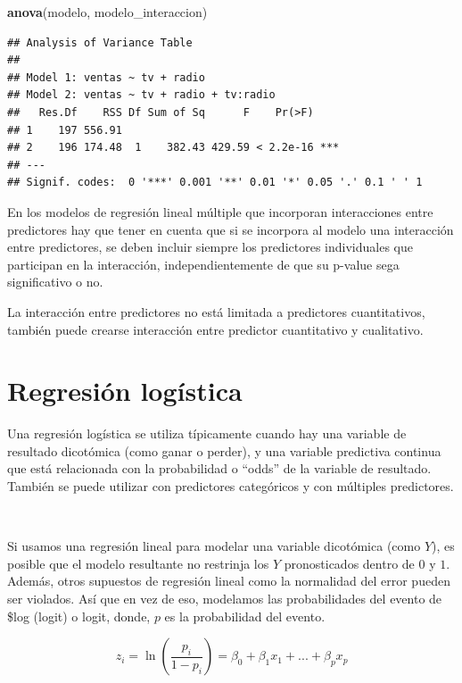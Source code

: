\documentclass[]{book}
\newenvironment{Shaded}{\begin{snugshade}}{\end{snugshade}}
\newcommand{\KeywordTok}[1]{\textcolor[rgb]{0.13,0.29,0.53}{\textbf{#1}}}
\newcommand{\NormalTok}[1]{#1}
\begin{document}
\begin{Shaded}
\begin{Highlighting}[]
\KeywordTok{anova}\NormalTok{(modelo, modelo_interaccion)}
\end{Highlighting}
\end{Shaded}

\begin{verbatim}
## Analysis of Variance Table
## 
## Model 1: ventas ~ tv + radio
## Model 2: ventas ~ tv + radio + tv:radio
##   Res.Df    RSS Df Sum of Sq      F    Pr(>F)    
## 1    197 556.91                                  
## 2    196 174.48  1    382.43 429.59 < 2.2e-16 ***
## ---
## Signif. codes:  0 '***' 0.001 '**' 0.01 '*' 0.05 '.' 0.1 ' ' 1
\end{verbatim}

En los modelos de regresión lineal múltiple que incorporan interacciones
entre predictores hay que tener en cuenta que si se incorpora al modelo
una interacción entre predictores, se deben incluir siempre los
predictores individuales que participan en la interacción,
independientemente de que su p-value sega significativo o no.

La interacción entre predictores no está limitada a predictores
cuantitativos, también puede crearse interacción entre predictor
cuantitativo y cualitativo.

\chapter{Regresión logística}\label{regresion-logistica}

Una regresión logística se utiliza típicamente cuando hay una variable
de resultado dicotómica (como ganar o perder), y una variable predictiva
continua que está relacionada con la probabilidad o ``odds'' de la
variable de resultado. También se puede utilizar con predictores
categóricos y con múltiples predictores.

~

Si usamos una regresión lineal para modelar una variable dicotómica
(como \(Y\)), es posible que el modelo resultante no restrinja los \(Y\)
pronosticados dentro de \(0\) y \(1\). Además, otros supuestos de
regresión lineal como la normalidad del error pueden ser violados. Así
que en vez de eso, modelamos las probabilidades del evento de \$log
(logit) o logit, donde, \(p\) es la probabilidad del evento.

\[
    z_i = \ln(\frac{p_i}{1-p_i}) =   \beta_0 + \beta_1 x_1 + ... + \beta_p x_p
\]
\end{document}
